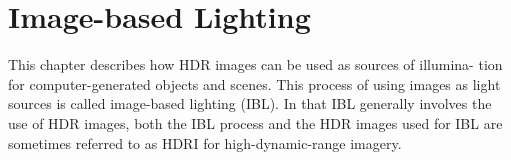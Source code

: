 \chapter{Image-based Lighting}

This chapter describes how HDR images can be used as sources of illumina- tion for computer-generated objects and scenes. This process of using images as light sources is called image-based lighting (IBL). In that IBL generally involves the use of HDR images, both the IBL process and the HDR images used for IBL are sometimes referred to as HDRI for high-dynamic-range imagery.